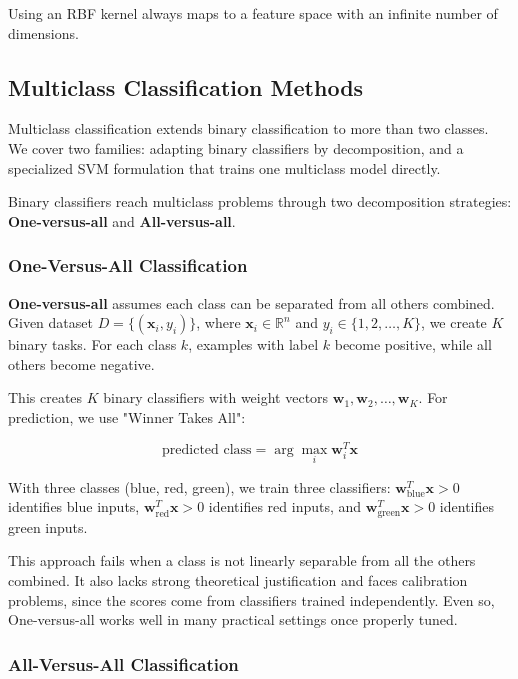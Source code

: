Using an RBF kernel always maps to a feature space with an infinite number of dimensions.


\subsection{Multiclass Classification Methods}

Multiclass classification extends binary classification to more than two classes. We cover two families: adapting binary classifiers by decomposition, and a specialized SVM formulation that trains one multiclass model directly.

Binary classifiers reach multiclass problems through two decomposition strategies: \textbf{One-versus-all} and \textbf{All-versus-all}.

\subsubsection{One-Versus-All Classification}
\textbf{One-versus-all} assumes each class can be separated from all others combined. Given dataset $D = \{(\mathbf{x}_i, y_i)\}$, where $\mathbf{x}_i \in \mathbb{R}^n$ and $y_i \in \{1, 2, \ldots, K\}$, we create $K$ binary tasks. For each class $k$, examples with label $k$ become positive, while all others become negative.

This creates $K$ binary classifiers with weight vectors $\mathbf{w}_1, \mathbf{w}_2, \ldots, \mathbf{w}_K$. For prediction, we use "Winner Takes All":

\begin{equation}
\text{predicted class} = \arg\max_i \mathbf{w}_i^T\mathbf{x}
\end{equation}

With three classes (blue, red, green), we train three classifiers: $\mathbf{w}_{\text{blue}}^T\mathbf{x} > 0$ identifies blue inputs, $\mathbf{w}_{\text{red}}^T\mathbf{x} > 0$ identifies red inputs, and $\mathbf{w}_{\text{green}}^T\mathbf{x} > 0$ identifies green inputs.

This approach fails when a class is not linearly separable from all the others combined. It also lacks strong theoretical justification and faces calibration problems, since the scores come from classifiers trained independently. Even so, One-versus-all works well in many practical settings once properly tuned.

\subsubsection{All-Versus-All Classification}

